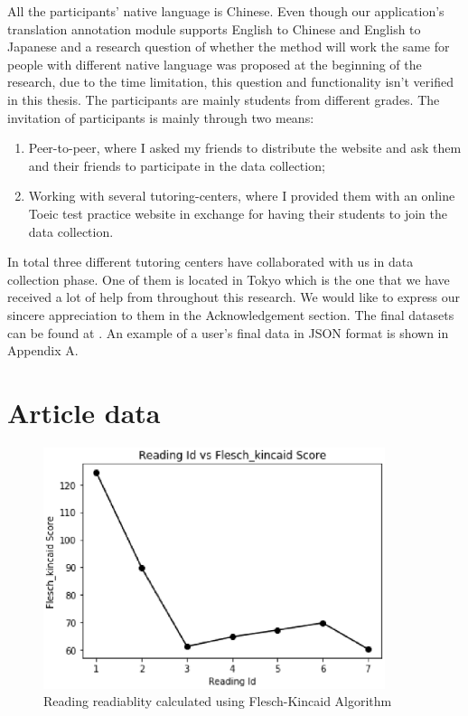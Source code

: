 All the participants' native language is Chinese. Even though our application's translation annotation module supports English to Chinese and English to Japanese and a research question of whether the method will work the same for people with different native language was proposed at the beginning of the research, due to the time limitation, this question and functionality isn't verified in this thesis. The participants are mainly students from different grades. The invitation of participants is mainly through two means:
\begin{enumerate}
  \item Peer-to-peer, where I asked my friends to distribute the website and ask them and their friends to participate in the data collection;
  \item Working with several tutoring-centers, where I provided them with an online Toeic test practice website in exchange for having their students to join the data collection.
\end{enumerate}

In total three different tutoring centers have collaborated with us in data collection phase. One of them is located in Tokyo which is the one that we have received a lot of help from throughout this research. We would like to express our sincere appreciation to them in the Acknowledgement section. The final datasets can be found at \cite{dataset}. An example of a user's final data in JSON format is shown in Appendix A.

\section{Article data}

\begin{figure}[tbp]
 \begin{center}
  \includegraphics[width=100mm]{data_fk_rid.eps}
 \end{center}
 \caption{\label{figure:fk_rid} Reading readiablity calculated using Flesch-Kincaid Algorithm}
\end{figure}

